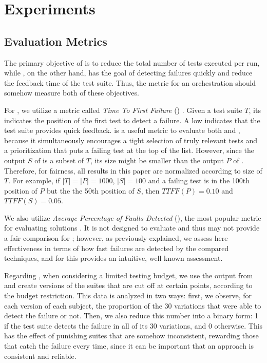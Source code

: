\section{Experiments}\label{sec:orch_experiments}

\subsection{Evaluation Metrics}
\label{subsec:metrics}

The primary objective of \tcs is to reduce the total number of tests executed per run, while \tcp, on the other hand, 
has the goal of detecting failures quickly and reduce the feedback time of the test suite.
Thus, the metric for an orchestration should somehow measure both of these objectives.

For , we utilize a metric called \textit{Time To First Failure} (\ttff) \cite{yoo2011faster}.
Given a test suite $T$, its \ttff indicates the position of the first test to detect a failure.
A low \ttff indicates that the test suite provides quick feedback.
\ttff is a useful metric to evaluate both \tcs and \tcp, because it simultaneously encourages a tight selection of truly relevant tests and a prioritization that puts a failing test at the top of the list.
However, since the output $S$ of \tcs is a subset of $T$, its size might be smaller than the output $P$ of \tcp.
Therefore, for fairness, all \ttff results in this paper are normalized according to size of $T$.
For example, if $|T| = |P| = 1000$, $|S| = 100$ and a failing test is in the 100th position of $P$ but the the 50th position of $S$, then $TTFF(P) = 0.10$ and $TTFF(S) = 0.05$.

We also utilize \textit{Average Percentage of Faults Detected} (\apfd), the most popular metric for evaluating \tcp solutions \cite{khatibsyarbini_test_2018}.
It is not designed to evaluate \tcs and thus may not provide a fair comparison for \ek; however, as previously explained, we assess here effectiveness in terms of how fast failures are detected by the compared techniques, and for this \apfd provides an intuitive, well known assessment.  

Regarding , when considering a limited testing budget, we use the output from  and create versions of the suites that are cut off at certain points, according to the budget restriction.
This data is analyzed in two ways: first, we observe, for each version of each subject, the proportion of the 30 variations that were able to detect the failure or not.
Then, we also reduce this number into a binary form: 1 if the test suite detects the failure in all of its 30 variations, and 0 otherwise.
This has the effect of punishing suites that are somehow inconsistent, rewarding those that catch the failure every time, 
since it can be
important that an approach is consistent and reliable.


